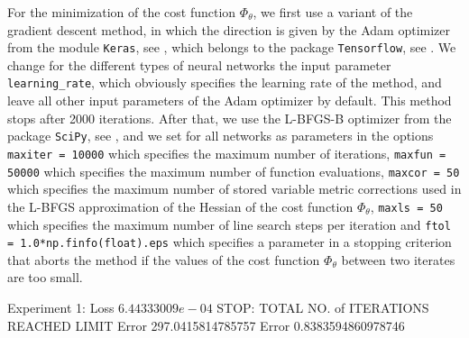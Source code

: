 For the minimization of the cost function $\Phi_{\theta}$, we first use a variant of the gradient descent method, in which the direction is given by the Adam optimizer from the module \lstinline!Keras!, see \cite{Chollet:2015}, which belongs to the package \lstinline!Tensorflow!, see \cite{TensorFlow}. We change for the different types of neural networks the input parameter \lstinline!learning_rate!, which obviously specifies the learning rate of the method, and leave all other input parameters of the Adam optimizer by default. This method stops after 2000 iterations. After that, we use the L-BFGS-B optimizer from the package \lstinline!SciPy!, see \cite{SciPy:2020}, and we set for all networks as parameters in the options \lstinline!maxiter = 10000! which specifies the maximum number of iterations, \lstinline!maxfun = 50000! which specifies the maximum number of function evaluations, \lstinline!maxcor = 50! which specifies the maximum number of stored variable metric corrections used in the L-BFGS approximation of the Hessian of the cost function $\Phi_{\theta}$, \lstinline!maxls = 50! which specifies the maximum number of line search steps per iteration and \lstinline!ftol = 1.0*np.finfo(float).eps! which specifies a parameter in a stopping criterion that aborts the method if the values of the cost function $\Phi_{\theta}$ between two iterates are too small.


\begin{table}[H]\label{tab:one_cost_function}
    \caption{Comparison of different types of neural networks.}
\end{table}

Experiment 1: Loss $6.44333009e-04$ STOP: TOTAL NO. of ITERATIONS REACHED LIMIT
Error 297.0415814785757
Error 0.8383594860978746
